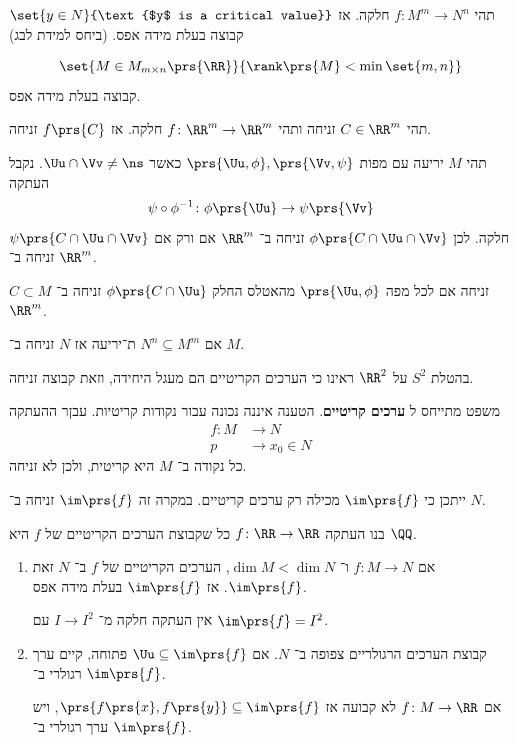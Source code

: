 \documentclass[a4paper,10pt,twoside,openany]{book}
\begin{document}
\begin{theorem}
תהי
$f \colon M^m \to N^n$
חלקה.
אז
$\set{y \in N}{\text{$y$ is a critical value}}$
קבוצה בעלת מידה אפס. (ביחס למידת לבג)
\end{theorem}
\begin{example}
\[\set{M \in M_{m\times n}\prs{\RR}}{\rank\prs{M} < \min\set{m,n}}\]
קבוצה בעלת מידה אפס.
\end{example}
\begin{proposition}
תהי
$C \in \RR^m$
זניחה ותהי
$f \colon \RR^m \to \RR^m$
חלקה. אז
$f\prs{C}$
זניחה.
\end{proposition}
\begin{corollary}
תהי
$M$
יריעה עם מפות
$\prs{\Uu, \phi}, \prs{\Vv, \psi}$
כאשר
$\Uu \cap \Vv \neq \ns$.
נקבל העתקה
\[\psi \circ \phi^{-1} \colon \phi\prs{\Uu} \to \psi\prs{\Vv}\]
חלקה.
לכן
$\phi \prs{C \cap \Uu \cap \Vv}$
זניחה ב־%
$\RR^m$
אם ורק אם
$\psi\prs{C \cap \Uu \cap \Vv}$
זניחה ב־%
$\RR^m$.
\end{corollary}
\begin{definition}
$C \subset M$
זניחה אם לכל מפה
$\prs{\Uu, \phi}$
מהאטלס החלק
$\phi\prs{C \cap \Uu}$
זניחה ב־%
$\RR^m$.
\end{definition}
\begin{example}
אם
$N^n \subseteq M^m$
ת־יריעה אז
$N$
זניחה ב־%
$M$.
\end{example}
\begin{example}
בהטלת
$S^2$
על
$\RR^2$
ראינו כי הערכים הקריטיים הם מעגל היחידה, וזאת קבוצה זניחה.
\end{example}
\begin{remark}
משפט
מתייחס ל%
\textbf{ערכים קריטיים}.
הטענה איננה נכונה עבור נקודות קריטיות.
עבןר ההעתקה
\begin{align*}
f \colon M &\to N \\
p &\to x_0 \in N
\end{align*}
כל נקודה ב־%
$M$
היא קריטית, ולכן לא זניחה.
\end{remark}
\begin{remark}
ייתכן כי
$\im\prs{f}$
מכילה רק ערכים קריטיים. במקרה זה
$\im\prs{f}$
זניחה ב־%
$N$.
\end{remark}
\begin{exercise}
בנו העתקה
$f \colon \RR \to \RR$
כל שקבוצת הערכים הקריטיים של
$f$
היא
$\QQ$.
\end{exercise}
\begin{corollary}
\begin{enumerate}
\item אם
$f \colon M \to N$
ו־%
$\dim M < \dim N$,
הערכים הקריטיים של
$f$
ב־%
$N$
זאת
$\im\prs{f}$.
אז
$\im\prs{f}$
בעלת מידה אפס.
\begin{example}
אין העתקה חלקה מ־%
$I \to I^2$
עם
$\im\prs{f} = I^2$.
\end{example}
\item קבוצת הערכים הרגולריים צפופה ב־%
$N$.
אם
$\Uu \subseteq \im\prs{f}$
פתוחה, קיים ערך רגולרי ב־%
$\im\prs{f}$.
\begin{example}
אם
$f \colon M \to \RR$
לא קבועה אז
$\prs{f\prs{x}, f\prs{y}} \subseteq \im\prs{f}$,
ויש ערך רגולרי ב־%
$\im\prs{f}$.
\end{example}
\end{enumerate}
\end{corollary}
\end{document}
